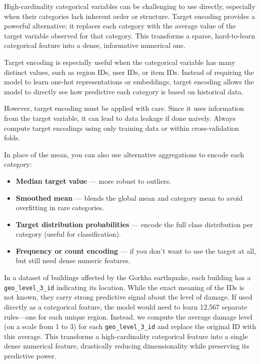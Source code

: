 \documentclass[12pt,openany, draft]{book}
\begin{document}
High-cardinality categorical variables can be challenging to use directly, especially when their categories lack inherent order or structure. Target encoding provides a powerful alternative: it replaces each category with the average value of the target variable observed for that category. This transforms a sparse, hard-to-learn categorical feature into a dense, informative numerical one.
\newline

Target encoding is especially useful when the categorical variable has many distinct values, such as region IDs, user IDs, or item IDs. Instead of requiring the model to learn one-hot representations or embeddings, target encoding allows the model to directly see how predictive each category is based on historical data.
\newline

However, target encoding must be applied with care. Since it uses information from the target variable, it can lead to data leakage if done naively. Always compute target encodings using only training data or within cross-validation folds.
\newline

In place of the mean, you can also use alternative aggregations to encode each category:
\begin{itemize}
  \item \textbf{Median target value} — more robust to outliers.
  \item \textbf{Smoothed mean} — blends the global mean and category mean to avoid overfitting in rare categories.
  \item \textbf{Target distribution probabilities} — encode the full class distribution per category (useful for classification).
  \item \textbf{Frequency or count encoding} — if you don’t want to use the target at all, but still need dense numeric features.
\end{itemize}

\begin{examplebox}
In a dataset of buildings affected by the Gorkha earthquake, each building has a \texttt{geo\_level\_3\_id} indicating its location. While the exact meaning of the IDs is not known, they carry strong predictive signal about the level of damage. If used directly as a categorical feature, the model would need to learn 12,567 separate rules—one for each unique region. Instead, we compute the average damage level (on a scale from 1 to 3) for each \texttt{geo\_level\_3\_id} and replace the original ID with this average. This transforms a high-cardinality categorical feature into a single dense numerical feature, drastically reducing dimensionality while preserving its predictive power.
\end{examplebox}
\end{document}
